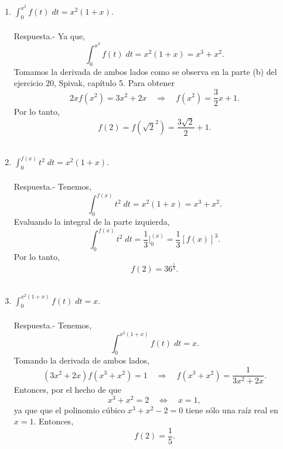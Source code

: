 \begin{enumerate}[\bfseries 1.]
\begin{enumerate}
	    \item $\displaystyle \int_0^{x^2} f(t)\; dt = x^2(1+x)$.\\\\
		Respuesta.-\; Ya que,
		$$\int_0^{x^2}f(t)\; dt = x^2(1+x)=x^3+x^2.$$
		Tomamos la derivada de ambos lados como se observa en la parte (b) del ejercicio 20, Spivak, capítulo 5. Para obtener
		$$2xf\left(x^2\right)=3x^2+2x\quad \Rightarrow \quad f\left(x^2\right)=\dfrac{3}{2}x+1.$$
		Por lo tanto,
		$$f(2)=f\left(\sqrt{2}^2\right)=\dfrac{3\sqrt{2}}{2}+1.$$\\

	    \item $\displaystyle \int_0^{f(x)} t^2\; dt = x^2(1+x)$.\\\\
		Respuesta.-\; Tenemos,
		$$\int_0^{f(x)}t^2\; dt = x^2(1+x)=x^3+x^2.$$
		Evaluando la integral de la parte izquierda,
		$$\int_0^{f(x)}t^2\; dt = \dfrac{1}{3}\bigg|_0^{(x)} = \dfrac{1}{3}\left[f(x)\right]^3.$$
		Por lo tanto,
		$$f(2)=36^{\frac{1}{3}}.$$\\

	    \item $\displaystyle \int_0^{x^2(1+x)} f(t)\; dt = x$.\\\\
		Respuesta.-\; Tenemos,
		$$\int_0^{x^2(1+x)}f(t)\; dt = x.$$
		Tomando la derivada de ambos lados,
		$$\left(3x^2+2x\right)f\left(x^3+x^2\right)=1\quad \Rightarrow \quad f\left(x^3+x^2\right)=\dfrac{1}{3x^2+2x}.$$
		Entonces, por el hecho de que
		$$x^3+x^2=2\quad \Leftrightarrow \quad x=1,$$
		ya que que el polinomio cúbico $x^3+x^2-2=0$ tiene sólo una raíz real en $x=1$. Entonces,
		$$f(2)=\dfrac{1}{5}.$$\\

	\end{enumerate}


\end{enumerate}
